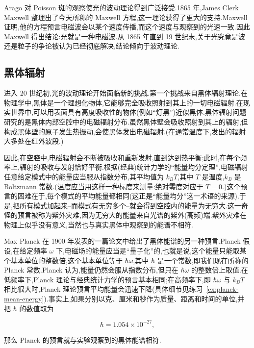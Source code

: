 Arago 对 Poisson 斑的观察使光的波动理论得到广泛接受.1865 年,James Clerk Maxwell 整理出了今天所称的 Maxwell 方程,这一理论获得了更大的支持.Maxwell 证明,他的方程预言电磁波会以某个速度传播,而这个速度与观察到的光速一致.因此 Maxwell 得出结论:光就是一种电磁波.从 1865 年直到 19 世纪末,关于光究竟是波还是粒子的争论被认为已经彻底解决,结论倾向于波动理论.

\subsection{黑体辐射}\label{subsec:blackbody-radiation}

进入 20 世纪初,光的波动理论开始面临新的挑战.第一个挑战来自黑体辐射理论.在物理学中,黑体是一个理想化物体,它能够完全吸收照射到其上的一切电磁辐射.在现实世界中,可以用表面具有高度吸收性的物体(例如“灯黑”)近似黑体.黑体辐射问题研究的是黑体内部空腔中的电磁辐射分布.虽然黑体壁会吸收照射到其上的辐射,但构成黑体壁的原子发生热振动,会使黑体发出电磁辐射.(在通常温度下,发出的辐射大多处在红外波段.)

因此,在空腔中,电磁辐射会不断被吸收和重新发射,直到达到热平衡;此时,在每个频率上,辐射的吸收与发射恰好平衡.根据(经典)统计力学的“能量均分定理”,电磁辐射任意给定模式中的能量应当服从指数分布,其平均值为 $k_B T$,其中 $T$ 是温度,$k_B$ 是 Boltzmann 常数.(温度应当用这样一种标度来测量:绝对零度对应于 $T=0$.)这个预言的困难在于,每个模式的平均能量都相同(这正是“能量均分”这一术语的来源).于是,把所有模式加起来--而模式有无穷多个--就会得到空腔内的能量为无穷大.这一奇怪的预言被称为紫外灾难,因为无穷大的能量来自光谱的紫外(高频)端.紫外灾难在物理上似乎没有意义,当然也与真实黑体中观察到的能谱不相符.

Max Planck 在 1900 年发表的一篇论文中给出了黑体能谱的另一种预言.Planck 假设,在给定频率 $\omega$ 下,电磁场的能量应当是“量子化”的,也就是说,这个能量只能取某个基本单位的整数倍,这个基本单位等于 $\hbar\omega$,其中 $\hbar$ 是一个常数,即我们现在所称的 Planck 常数.Planck 认为,能量仍然会服从指数分布,但只在 $\hbar\omega$ 的整数倍上取值.在低频率下,Planck 理论与经典统计力学的预言基本相同;在高频率下,即 $\hbar\omega$ 与 $k_B T$ 相比很大时,Planck 理论预言平均能量会迅速下降(具体细节见练习~\ref{ex:planck-mean-energy}).事实上,如果分别以克、厘米和秒作为质量、距离和时间的单位,并把 $\hbar$ 的数值取为

\begin{equation}
  \hbar=1.054\times 10^{-27},\label{eq:planck-constant-cgs}
\end{equation}

那么 Planck 的预言就与实验观察到的黑体能谱相符.

